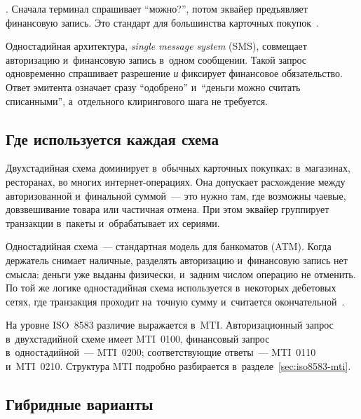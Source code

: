 . Сначала
терминал спрашивает \enquote{можно?}, потом эквайер предъявляет финансовую
запись. Это стандарт для большинства карточных
покупок~\cite{visa-core-rules,mc-tpr}.

Одностадийная архитектура, \textit{single message system} (SMS), совмещает
авторизацию и~финансовую запись в~одном сообщении. Такой запрос одновременно спрашивает разрешение \emph{и} фиксирует
финансовое обязательство. Ответ эмитента означает сразу \enquote{одобрено}
и~\enquote{деньги можно считать списанными}, а~отдельного клирингового шага не
требуется.

\subsection*{Где используется каждая схема}

Двухстадийная схема доминирует в~обычных карточных покупках: в~магазинах,
ресторанах, во многих интернет-операциях. Она допускает расхождение между
авторизованной и~финальной суммой~--- это нужно там, где возможны чаевые,
довзвешивание товара или частичная отмена. При этом эквайер группирует транзакции
в~пакеты и~обрабатывает их сериями.

Одностадийная схема~--- стандартная модель для банкоматов (ATM). Когда
держатель снимает наличные, разделять авторизацию и~финансовую запись нет
смысла: деньги уже выданы физически, и~задним числом операцию не отменить. По
той же логике одностадийная схема используется в~некоторых дебетовых сетях, где
транзакция проходит на~точную сумму и~считается
окончательной~\cite{visa-core-rules,mc-tpr}.

На уровне ISO~8583 различие выражается в~MTI. Авторизационный запрос
в~двухстадийной схеме имеет MTI~0100, финансовый запрос в~одностадийной~---
MTI~0200; соответствующие ответы~--- MTI~0110 и~MTI~0210. Структура MTI
подробно разбирается в~разделе~\ref{sec:iso8583-mti}.


\subsection*{Гибридные варианты}

